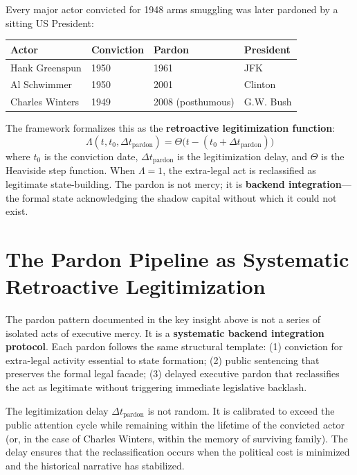 \begin{keyinsight}
Every major actor convicted for 1948 arms smuggling was later pardoned by a sitting US President:
\begin{center}
\begin{tabular}{llll}
\toprule
\textbf{Actor} & \textbf{Conviction} & \textbf{Pardon} & \textbf{President} \\
\midrule
Hank Greenspun & 1950 & 1961 & JFK \\
Al Schwimmer & 1950 & 2001 & Clinton \\
Charles Winters & 1949 & 2008 (posthumous) & G.W. Bush \\
\bottomrule
\end{tabular}
\end{center}
The framework formalizes this as the \textbf{retroactive legitimization function}:
\begin{equation}\label{eq:gp8-retroactive-legitimization}
\Lambda(t, t_0, \Delta t_{\text{pardon}}) = \Theta\bigl(t - (t_0 + \Delta t_{\text{pardon}})\bigr)
\end{equation}
where $t_0$ is the conviction date, $\Delta t_{\text{pardon}}$ is the legitimization delay, and $\Theta$ is the Heaviside step function. When $\Lambda = 1$, the extra-legal act is reclassified as legitimate state-building. The pardon is not mercy; it is \textbf{backend integration}---the formal state acknowledging the shadow capital without which it could not exist.
\end{keyinsight}

\section{The Pardon Pipeline as Systematic Retroactive Legitimization}

The pardon pattern documented in the key insight above is not a series of isolated acts of executive mercy. It is a \textbf{systematic backend integration protocol}. Each pardon follows the same structural template: (1) conviction for extra-legal activity essential to state formation; (2) public sentencing that preserves the formal legal facade; (3) delayed executive pardon that reclassifies the act as legitimate without triggering immediate legislative backlash.

The legitimization delay $\Delta t_{\text{pardon}}$ is not random. It is calibrated to exceed the public attention cycle while remaining within the lifetime of the convicted actor (or, in the case of Charles Winters, within the memory of surviving family). The delay ensures that the reclassification occurs when the political cost is minimized and the historical narrative has stabilized.

